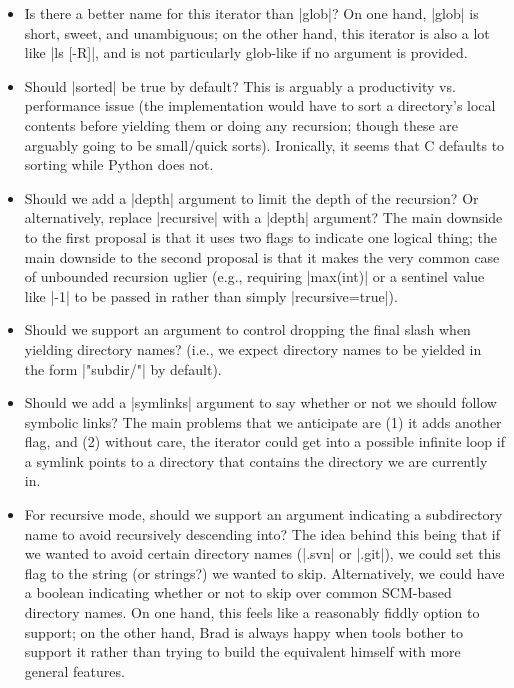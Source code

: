 \documentclass{article}
\begin{document}
\begin{itemize}
\item Is there a better name for this iterator than |glob|?  On one
  hand, |glob| is short, sweet, and unambiguous; on the other hand,
  this iterator is also a lot like |ls [-R]|, and is not particularly
  glob-like if no argument is provided.

\item Should |sorted| be true by default?  This is arguably a
  productivity vs. performance issue (the implementation would have to
  sort a directory's local contents before yielding them or doing any
  recursion; though these are arguably going to be small/quick sorts).
  Ironically, it seems that C defaults to sorting while Python does
  not.

\item Should we add a |depth| argument to limit the depth of the
  recursion?  Or alternatively, replace |recursive| with a |depth|
  argument?  The main downside to the first proposal is that it uses
  two flags to indicate one logical thing; the main downside to the
  second proposal is that it makes the very common case of unbounded
  recursion uglier (e.g., requiring |max(int)| or a sentinel value
  like |-1| to be passed in rather than simply |recursive=true|).

\item Should we support an argument to control dropping the final
  slash when yielding directory names?  (i.e., we expect directory
  names to be yielded in the form |"subdir/"| by default).

\item Should we add a |symlinks| argument to say whether or not we
  should follow symbolic links? The main problems that we anticipate
  are (1) it adds another flag, and (2) without care, the iterator
  could get into a possible infinite loop if a symlink points to a
  directory that contains the directory we are currently in.

\item For recursive mode, should we support an argument indicating a
  subdirectory name to avoid recursively descending into?  The idea
  behind this being that if we wanted to avoid certain directory names
  (\eg |.svn| or |.git|), we could set this flag to the string (or
  strings?) we wanted to skip.  Alternatively, we could have a boolean
  indicating whether or not to skip over common SCM-based directory
  names.  On one hand, this feels like a reasonably fiddly option to
  support; on the other hand, Brad is always happy when tools bother
  to support it rather than trying to build the equivalent himself
  with more general features.


\end{itemize}
\end{document}
